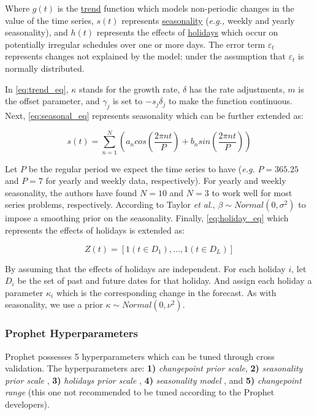 Where $g(t)$ is the \underline{trend} function which models non-periodic changes in the value of the time series, $s(t)$ represents \underline{seasonality} (\textit{e.g.,} weekly and yearly seasonality), and $h(t)$ represents the effects of \underline{holidays} which occur on potentially irregular schedules over one or more days. The error term $\varepsilon_t$ represents changes not explained by the model; under the assumption that $\varepsilon_t$ is normally distributed.

In \autoref{eq:trend_eq}, $\kappa$ stands for the growth rate, $\delta$ has the rate adjustments, $m$ is the offset parameter, and $\gamma_j$ is set to $-s_j\delta_j$ to make the function continuous. Next, \autoref{eq:seasonal_eq} represents seasonality which can be further extended as:

\[ s(t) = \sum_{n=1}^N \left( a_n cos\left(\frac{2\pi nt}{P}\right) + b_n sin\left( \frac{2\pi nt}{P}  \right)     \right)  \]

Let $P$ be the regular period we expect the time series to have (\textit{e.g.} $P=365.25$ and $P=7$ for yearly and weekly data, respectively). For yearly and weekly seasonality, the authors have found $N = 10$ and $N = 3$ to work well for most series problems, respectively. According to Taylor \textit{et al.}, $\beta \sim Normal(0,\sigma^2)$ to impose a smoothing prior on the
seasonality. Finally, \autoref{eq:holiday_eq} which represents the effects of holidays is extended as:

\[ Z(t) = [1(t \in  D_1) ,..., 1(t \in  D_L)]  \]

By assuming that the effects of holidays are independent. For each holiday $i$, let $D_i$ be the set of past and future dates for that holiday. And assign each holiday a parameter $\kappa_i$ which is the corresponding change in the forecast. As with seasonality, we use a prior $\kappa \sim Normal(0,\nu^2)$.


\subsubsection[Prophet Hyperparameters]{Prophet Hyperparameters}
\label{sec:hyperparameters}

Prophet possesses 5 hyperparameters which can be tuned through cross validation. The hyperparameters are: \textbf{1)} \textit{changepoint prior scale}, \textbf{2)} \textit{seasonality prior scale} , \textbf{3)} \textit{holidays prior scale} , \textbf{4)} \textit{seasonality model} , and \textbf{5)} \textit{changepoint range}  (this one not recommended to be tuned according to the Prophet developers).  

